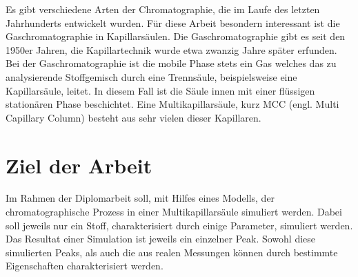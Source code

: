 
% 
% 
  

Es gibt verschiedene Arten der Chromatographie, die im Laufe des letzten Jahrhunderts entwickelt wurden. Für diese Arbeit besondern interessant ist die Gaschromatographie in Kapillarsäulen. Die Gaschromatographie gibt es seit den 1950er Jahren, die Kapillartechnik wurde etwa zwanzig Jahre später erfunden.
Bei der Gaschromatographie ist die mobile Phase stets ein Gas welches das zu analysierende Stoffgemisch durch eine Trennsäule, beispielsweise eine Kapillarsäule, leitet. In diesem Fall ist die Säule innen mit einer flüssigen stationären Phase beschichtet. Eine Multikapillarsäule, kurz MCC (engl. Multi Capillary Column) besteht aus sehr vielen dieser Kapillaren.




\section{Ziel der Arbeit}

Im Rahmen der Diplomarbeit soll, mit Hilfes eines Modells, der chromatographische Prozess in einer Multikapillarsäule simuliert werden. 
Dabei soll jeweils nur ein Stoff, charakterisiert durch einige Parameter, simuliert werden. Das Resultat einer Simulation ist jeweils ein einzelner Peak. Sowohl diese simulierten Peaks, als auch die aus realen Messungen können durch bestimmte Eigenschaften charakterisiert werden. 

